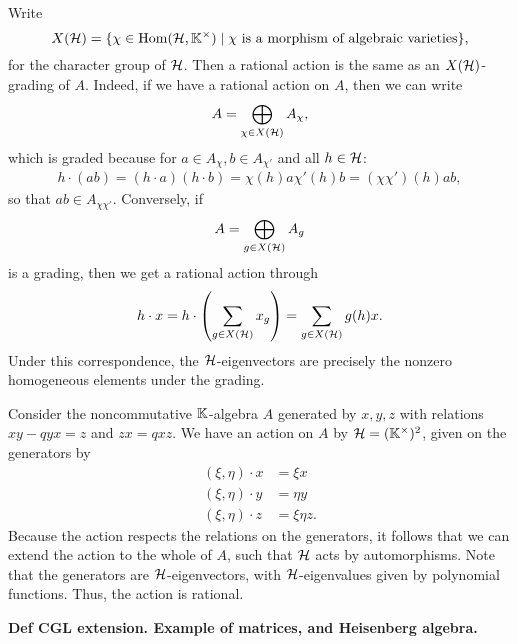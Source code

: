 Write
\begin{equation*}
	X(\mathcal{H}) = \{\chi \in \operatorname{Hom}(\mathcal{H}, \mathbb{K}^\times) \mid \chi \text{ is a morphism of algebraic varieties}\},
\end{equation*}
%
for the character group of $\mathcal{H}$. Then a rational action is the
same as an $X(\mathcal{H})$-grading of $A$. Indeed, if we have a rational
action on $A$, then we can write
\begin{equation*}
	A = \bigoplus_{\chi \in X(\mathcal{H})} A_\chi,
\end{equation*}
which is graded because for $a \in A_\chi, b \in A_{\chi'}$ and all $h \in \mathcal{H}$:
\begin{align*}
	h \cdot (a b) = (h\cdot a)(h\cdot b)= \chi(h)a \chi'(h)b = (\chi \chi')(h)ab,
\end{align*}
so that $ab \in A_{\chi \chi'}$. Conversely, if
\begin{equation*}
	A = \bigoplus_{g \in X(\mathcal{H})} A_g
\end{equation*}
is a grading, then we get a rational action through
\begin{equation*}
	h \cdot x = h \cdot \left(\sum_{g \in X(\mathcal{H})} x_g \right) = \sum_{g \in X(\mathcal{H})} g(h)x.
\end{equation*}
%
Under this correspondence, the $\mathcal{H}$-eigenvectors are precisely the nonzero
homogeneous elements under the grading.

\begin{example}
	Consider the noncommutative $\mathbb{K}$-algebra $A$ generated by $x,y,z$ with relations $xy
		-qyx = z$ and $zx = qxz$. We have an action on $A$ by $\mathcal{H} = (\mathbb{K}^\times)^2$, given
	on the generators by
	\begin{align*}
		(\xi, \eta)\cdot x & = \xi x      \\
		(\xi, \eta)\cdot y & = \eta y     \\
		(\xi, \eta)\cdot z & = \xi\eta z.
	\end{align*}
	Because the action respects the relations on the generators, it follows that we can
	extend the action to the whole of $A$, such that $\mathcal{H}$ acts by automorphisms. Note
	that the generators are $\mathcal{H}$-eigenvectors, with $\mathcal{H}$-eigenvalues given by
	polynomial functions. Thus, the action is rational.

\end{example}

\textbf{Def CGL extension. Example of matrices, and Heisenberg algebra.}

